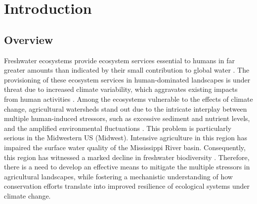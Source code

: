 \documentclass[12pt, class=article, crop=false]{standalone}
\begin{document}

\section{Introduction}

\subsection{Overview}

Freshwater ecosystems provide ecosystem services essential to humans in far greater amounts than indicated by their small contribution to global water \citep{dodds_freshwater_2017}.
The provisioning of these ecosystem services in human-dominated landscapes is under threat due to increased climate variability, which aggravates existing impacts from human activities \citep{reid_emerging_2019}.
Among the ecosystems vulnerable to the effects of climate change, agricultural watersheds stand out due to the intricate interplay between multiple human-induced stressors, such as excessive sediment and nutrient levels, and the amplified environmental fluctuations \citep{piggott_climate_2015, birk_impacts_2020}.
This problem is particularly serious in the Midwestern US (Midwest).
Intensive agriculture in this region has impaired the surface water quality of the Mississippi River basin.
Consequently, this region has witnessed a marked decline in freshwater biodiversity \citep{engstrom_historical_2009, hansen_contribution_2018, kelley_source_2000, hansen_coupling_2016, terui_quantifying_2019}.
Therefore, there is a need to develop an effective means to mitigate the multiple stressors in agricultural landscapes, while fostering a mechanistic understanding of how conservation efforts translate into improved resilience of ecological systems under climate change.
\end{document}
